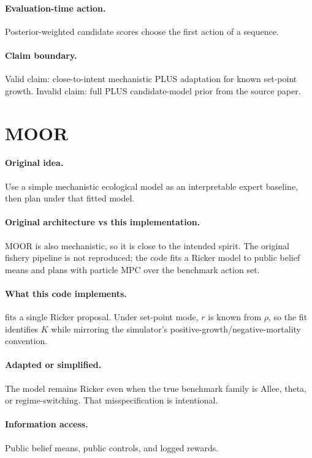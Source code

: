 \documentclass[11pt]{article}
\begin{document}
\paragraph{Evaluation-time action.}
Posterior-weighted candidate scores choose the first action of a sequence.

\paragraph{Claim boundary.}
Valid claim: close-to-intent mechanistic PLUS adaptation for known set-point
growth. Invalid claim: full PLUS candidate-model prior from the source paper.

\section{MOOR}

\paragraph{Original idea.}
Use a simple mechanistic ecological model as an interpretable expert baseline,
then plan under that fitted model.

\paragraph{Original architecture vs this implementation.}
MOOR is also mechanistic, so it is close to the intended spirit. The original
fishery pipeline is not reproduced; the code fits a Ricker model to public
belief means and plans with particle MPC over the benchmark action set.

\paragraph{What this code implements.}
 fits a single Ricker proposal. Under set-point mode, $r$ is known
from $\rho$, so the fit identifies $K$ while mirroring the simulator's
positive-growth/negative-mortality convention.

\paragraph{Adapted or simplified.}
The model remains Ricker even when the true benchmark family is Allee, theta, or
regime-switching. That misspecification is intentional.

\paragraph{Information access.}
Public belief means, public controls, and logged rewards.
\end{document}
